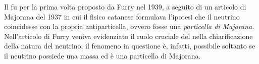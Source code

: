 

Il \doppiobeta{} fu per la prima volta proposto da Furry nel 1939\cite{furry:pr39}, a seguito di un articolo di Majorana del 1937\cite{majorana:nc37} in cui il fisico catanese formulava l'ipotesi che il neutrino coincidesse con la propria antiparticella, ovvero fosse una \emph{particella di Majorana}. 
Nell'articolo di Furry veniva evidenziato il ruolo cruciale del \doppiobeta{} nella chiarificazione della natura del neutrino; il fenomeno in questione è, infatti, possibile soltanto se il neutrino possiede una massa ed è una particella di Majorana. 



